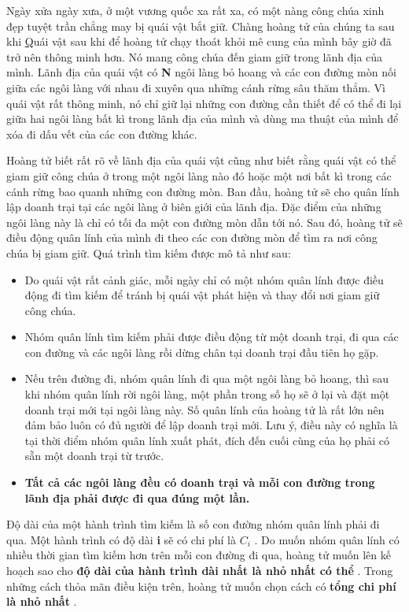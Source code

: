Ngày xửa ngày xưa, ở một vương quốc xa rất xa, có một nàng công chúa xinh đẹp tuyệt trần chẳng may bị quái vật bắt giữ. Chàng hoàng tử của chúng ta sau khi \href{vnoi.info/problems/show/VOBOARD2/{ thoát ra được mê cung } chưa bao lâu thì hay tin này và chàng ngay lập tức dẫn quân lính đi giải cứu công chúa. }

Quái vật sau khi để hoàng tử chạy thoát khỏi mê cung của mình bây giờ đã trở nên thông minh hơn. Nó mang công chúa đến giam giữ trong lãnh địa của mình. Lãnh địa của quái vật có \textbf{ N } ngôi làng bỏ hoang và các con đường mòn nối giữa các ngôi làng với nhau đi xuyên qua những cánh rừng sâu thăm thẳm. Vì quái vật rất thông minh, nó chỉ giữ lại những con đường cần thiết để có thể đi lại giữa hai ngôi làng bất kì trong lãnh địa của mình và dùng ma thuật của mình để xóa đi dấu vết của các con đường khác.

Hoàng tử biết rất rõ về lãnh địa của quái vật cũng như biết rằng quái vật có thể giam giữ công chúa ở trong một ngôi làng nào đó hoặc một nơi bất kì trong các cánh rừng bao quanh những con đường mòn. Ban đầu, hoàng tử sẽ cho quân lính lập doanh trại tại các ngôi làng ở biên giới của lãnh địa. Đặc điểm của những ngôi làng này là chỉ có tối đa một con đường mòn dẫn tới nó. Sau đó, hoàng tử sẽ điều động quân lính của mình đi theo các con đường mòn để tìm ra nơi công chúa bị giam giữ. Quá trình tìm kiếm được mô tả như sau:
\begin{itemize}
	\item Do quái vật rất cảnh giác, mỗi ngày chỉ có một nhóm quân lính được điều động đi tìm kiếm để tránh bị quái vật phát hiện và thay đổi nơi giam giữ công chúa.
	\item Nhóm quân lính tìm kiếm phải được điều động từ một doanh trại, đi qua các con đường và các ngôi làng rồi dừng chân tại doanh trại đầu tiên họ gặp.
	\item Nếu trên đường đi, nhóm quân lính đi qua một ngôi làng bỏ hoang, thì sau khi nhóm quân lính rời ngôi làng, một phần trong số họ sẽ ở lại và đặt một doanh trại mới tại ngôi làng này. Số quân lính của hoàng tử là rất lớn nên đảm bảo luôn có đủ người để lập doanh trại mới. Lưu ý, điều này có nghĩa là tại thời điểm nhóm quân lính xuất phát, đích đến cuối cùng của họ phải có sẵn một doanh trại từ trước.
	\item \textbf{Tất cả các ngôi làng đều có doanh trại và mỗi con đường trong lãnh địa phải được đi qua đúng một lần. }
\end{itemize}

Độ dài của một hành trình tìm kiếm là số con đường nhóm quân lính phải đi qua. Một hành trình có độ dài \textbf{ i } sẽ có chi phí là \textbf{ $C_{i}$} . Do muốn nhóm quân lính có nhiều thời gian tìm kiếm hơn trên mỗi con đường đi qua, hoàng tử muốn lên kế hoạch sao cho \textbf{ độ dài của hành trình dài nhất là nhỏ nhất có thể } . Trong những cách thỏa mãn điều kiện trên, hoàng tử muốn chọn cách có \textbf{ tổng chi phí là nhỏ nhất } .